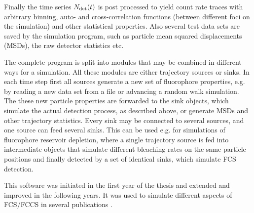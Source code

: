 Finally the time series  ${N}_{\text{det}}(t)$ is post processed to yield count rate traces with arbitrary binning, auto- and cross-correlation functions (between different foci on the simulation) and other statistical properties. Also several test data sets are saved by the simulation program, such as particle mean squared displacements (MSDs), the raw detector statistics etc.

The complete program is split into modules that may be combined in different ways for a simulation. All these modules are either trajectory sources or sinks. In each time step first all sources generate a new set of fluorophore properties, e.g. by reading a new data set from a file or advancing a random walk simulation. The these new particle properties are forwarded to the sink objects, which simulate the actual detection process, as described above, or generate MSDs and other trajectory statistics. Every sink may be connected to several sources, and one source can feed several sinks. This can be used e.g. for simulations of fluorophore reservoir depletion, where a single trajectory source is fed into intermediate objects that simulate different bleaching rates on the same particle positions and finally detected by a set of identical sinks, which simulate FCS detection.

This software was initiated in the first year of the thesis and extended and improved in the following years. It was used to simulate different aspects of FCS/FCCS in several publications \cite{WOCJAN2009,BUCHHO2012,SINGHKRIEGER2013,KRIEGE2014}.

